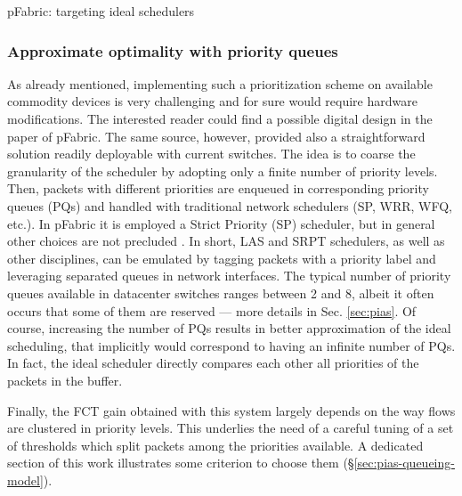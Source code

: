 \begin{subsection}{pFabric: targeting ideal schedulers}
 \subsubsection{Approximate optimality with priority queues}
As already mentioned, implementing such a prioritization scheme on available commodity devices is very challenging and for sure would require hardware modifications. The interested reader could find a possible digital design in the paper of pFabric. The same source, however, provided also a straightforward solution readily deployable with current switches. The idea is to coarse the granularity of the scheduler by adopting only a finite number of priority levels. Then, packets with different priorities are enqueued in corresponding priority queues (PQs) and handled with traditional network schedulers (SP, WRR, WFQ, etc.). In pFabric it is employed a Strict Priority (SP) scheduler, but in general other choices are not precluded \cite{mqecn}. In short, LAS and SRPT schedulers, as well as other disciplines, can be emulated by tagging packets with a priority label and leveraging separated queues in network interfaces. The typical number of priority queues available in datacenter switches ranges between 2 and 8, albeit it often occurs that some of them are reserved --- more details in Sec. \ref{sec:pias}. Of course, increasing the number of PQs results in better approximation of the ideal scheduling, that implicitly would correspond to having an infinite number of PQs. In fact, the ideal scheduler directly compares each other all priorities of the packets in the buffer.

Finally, the FCT gain obtained with this system largely depends on the way flows are clustered in priority levels. This underlies the need of a careful tuning of a set of thresholds which split packets among the priorities available. A dedicated section of this work illustrates some criterion to choose them (\S \ref{sec:pias-queueing-model}). 

\end{subsection}

